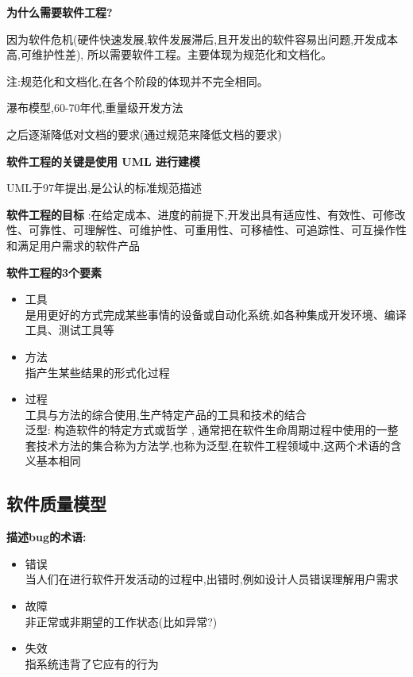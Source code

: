 \documentclass[UTF8,a4paper]{ctexart}
\newcommand{\spaceline}{\vspace{\baselineskip}}
\begin{document}
  \textbf{为什么需要软件工程?}

  因为软件危机(硬件快速发展,软件发展滞后,且开发出的软件容易出问题,开发成本高,可维护性差),
  所以需要软件工程。主要体现为规范化和文档化。

  注:规范化和文档化,在各个阶段的体现并不完全相同。

  瀑布模型,60-70年代,重量级开发方法

  之后逐渐降低对文档的要求(通过规范来降低文档的要求)

  \textbf{软件工程的关键是使用 UML 进行建模}

  UML于97年提出,是公认的标准规范描述

  \textbf{软件工程的目标}
  :在给定成本、进度的前提下,开发出具有适应性、有效性、可修改性、可靠性、可理解性、可维护性、可重用性、可移植性、可追踪性、可互操作性和满足用户需求的软件产品

  \spaceline
  \textbf{软件工程的3个要素}
  \begin{itemize}
    \item 工具\\
    是用更好的方式完成某些事情的设备或自动化系统,如各种集成开发环境、编译工具、测试工具等
    \item 方法\\
    指产生某些结果的形式化过程
    \item 过程\\
    工具与方法的综合使用,生产特定产品的工具和技术的结合\\
    泛型:  构造软件的特定方式或哲学 , 通常把在软件生命周期过程中使用的一整套技术方法的集合称为方法学,也称为泛型,在软件工程领域中,这两个术语的含义基本相同

  \end{itemize}

\subsection{软件质量模型}

  \spaceline
  \textbf{描述bug的术语:}
  \begin{itemize}
    \item 错误\\
    当人们在进行软件开发活动的过程中,出错时,例如设计人员错误理解用户需求
    \item 故障\\
    非正常或非期望的工作状态(比如异常?)
    \item 失效\\
    指系统违背了它应有的行为
  \end{itemize}
\end{document}
